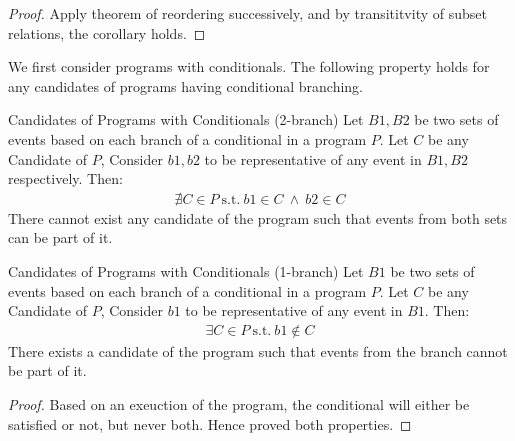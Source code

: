     \begin{proof}
        Apply theorem of reordering successively, and by transititvity of subset relations, the corollary holds.
    \end{proof}


    We first consider programs with conditionals. The following property holds for any candidates of programs having conditional branching. 

    \begin{property}{Candidates of Programs with Conditionals (2-branch)}
        Let $B1,B2$ be two sets of events based on each branch of a conditional in a program $P$. Let $C$ be any Candidate of $P$, Consider $b1,b2$ to be representative of any event in $B1,B2$ respectively. Then:
        \begin{align*}
            \nexists C \in P \ \text{s.t.} \ b1 \in C \ \wedge \ b2 \in C 
        \end{align*}
        There cannot exist any candidate of the program such that events from both sets can be part of it. 
    \end{property}

    \begin{property}{Candidates of Programs with Conditionals (1-branch)}
        Let $B1$ be two sets of events based on each branch of a conditional in a program $P$. Let $C$ be any Candidate of $P$, Consider $b1$ to be representative of any event in $B1$. Then:
        \begin{align*}
            \exists C \in P \ \text{s.t.} \ b1 \notin C  
        \end{align*}
        There exists a candidate of the program such that events from the branch cannot be part of it. 
    \end{property}


    \begin{proof}
        Based on an exeuction of the program, the conditional will either be satisfied or not, but never both. Hence proved both properties. 
    \end{proof}

